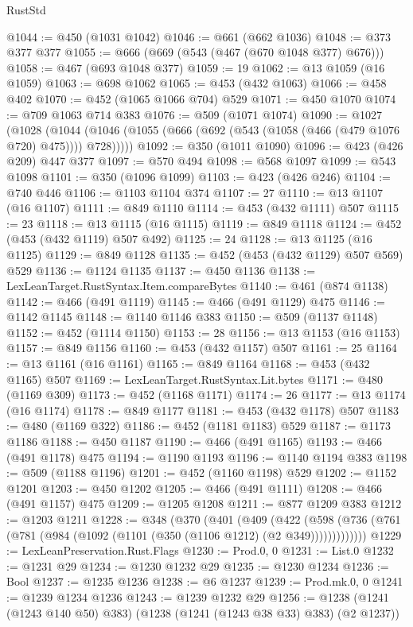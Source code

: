\begin{lexlean}{RustStd}
\begin{coremodule}
{\begin{coremodule}
{{{{{{{{{{{{@1044 := @450 (@1031 @1042)
@1046 := @661 (@662 @1036)
@1048 := @373 @377 @377
@1055 := @666 (@669 (@543 (@467 (@670 @1048 @377) @676)))
@1058 := @467 (@693 @1048 @377)
@1059 := 19
@1062 := @13 @1059 (@16 @1059)
@1063 := @698 @1062
@1065 := @453 (@432 @1063)
@1066 := @458 @402
@1070 := @452 (@1065 @1066 @704) @529
@1071 := @450 @1070
@1074 := @709 @1063 @714 @383
@1076 := @509 (@1071 @1074)
@1090 := @1027
    (@1028 (@1044 (@1046 (@1055 (@666 (@692 (@543 (@1058 (@466 (@479 @1076 @720) @475)))) @728)))))
@1092 := @350 (@1011 @1090)
@1096 := @423 (@426 @209) @447 @377
@1097 := @570 @494
@1098 := @568 @1097
@1099 := @543 @1098
@1101 := @350 (@1096 @1099)
@1103 := @423 (@426 @246)
@1104 := @740 @446
@1106 := @1103 @1104 @374
@1107 := 27
@1110 := @13 @1107 (@16 @1107)
@1111 := @849 @1110
@1114 := @453 (@432 @1111) @507
@1115 := 23
@1118 := @13 @1115 (@16 @1115)
@1119 := @849 @1118
@1124 := @452 (@453 (@432 @1119) @507 @492)
@1125 := 24
@1128 := @13 @1125 (@16 @1125)
@1129 := @849 @1128
@1135 := @452 (@453 (@432 @1129) @507 @569) @529
@1136 := @1124 @1135
@1137 := @450 @1136
@1138 := LexLeanTarget.RustSyntax.Item.compareBytes
@1140 := @461 (@874 @1138)
@1142 := @466 (@491 @1119)
@1145 := @466 (@491 @1129) @475
@1146 := @1142 @1145
@1148 := @1140 @1146 @383
@1150 := @509 (@1137 @1148)
@1152 := @452 (@1114 @1150)
@1153 := 28
@1156 := @13 @1153 (@16 @1153)
@1157 := @849 @1156
@1160 := @453 (@432 @1157) @507
@1161 := 25
@1164 := @13 @1161 (@16 @1161)
@1165 := @849 @1164
@1168 := @453 (@432 @1165) @507
@1169 := LexLeanTarget.RustSyntax.Lit.bytes
@1171 := @480 (@1169 @309)
@1173 := @452 (@1168 @1171)
@1174 := 26
@1177 := @13 @1174 (@16 @1174)
@1178 := @849 @1177
@1181 := @453 (@432 @1178) @507
@1183 := @480 (@1169 @322)
@1186 := @452 (@1181 @1183) @529
@1187 := @1173 @1186
@1188 := @450 @1187
@1190 := @466 (@491 @1165)
@1193 := @466 (@491 @1178) @475
@1194 := @1190 @1193
@1196 := @1140 @1194 @383
@1198 := @509 (@1188 @1196)
@1201 := @452 (@1160 @1198) @529
@1202 := @1152 @1201
@1203 := @450 @1202
@1205 := @466 (@491 @1111)
@1208 := @466 (@491 @1157) @475
@1209 := @1205 @1208
@1211 := @877 @1209 @383
@1212 := @1203 @1211
@1228 := @348
    (@370
      (@401
        (@409
          (@422
            (@598 (@736 (@761 (@781 (@984 (@1092 (@1101 (@350 (@1106 @1212) (@2 @349)))))))))))))
@1229 := LexLeanPreservation.Rust.Flags
@1230 := Prod.{0, 0}
@1231 := List.{0}
@1232 := @1231 @29
@1234 := @1230 @1232 @29
@1235 := @1230 @1234
@1236 := Bool
@1237 := @1235 @1236
@1238 := @6 @1237
@1239 := Prod.mk.{0, 0}
@1241 := @1239 @1234 @1236
@1243 := @1239 @1232 @29
@1256 := @1238 (@1241 (@1243 @140 @50) @383) (@1238 (@1241 (@1243 @38 @33) @383) (@2 @1237))
}}}}}}}}}}}}
\end{coremodule}}
\end{coremodule}
\end{lexlean}
